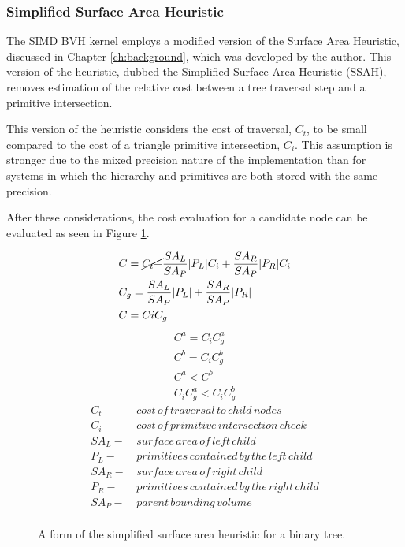 \subsubsection{Simplified Surface Area Heuristic}

The SIMD BVH kernel employs a modified version of the Surface Area Heuristic,
discussed in Chapter \ref{ch:background}, which was developed by the
author. This version of the heuristic, dubbed the Simplified Surface Area
Heuristic (SSAH), removes estimation of the relative cost between a tree
traversal step and a primitive intersection.

This version of the heuristic considers the cost of traversal, $C_{t}$, to be
small compared to the cost of a triangle primitive intersection, $C_{i}$. This
assumption is stronger due to the mixed precision nature of the implementation
than for systems in which the hierarchy and primitives are both stored with the
same precision.

After these considerations, the cost evaluation for a candidate node can be
evaluated as seen in Figure \ref{fig:SSAH}.

\begin{figure}[H]
  \begin{align}
&C =  \cancel{C_{t} +} \frac{SA_{L}}{SA_{P}} |P_{L}|C_{i} + \frac{SA_{R}}{SA_{P}} |P_{R}|C_{i} \\
&C_{g} = \frac{SA_{L}}{SA_{P}} |P_{L}| +  \frac{SA_{R}}{SA_{P}}|P_{R}| \\
&C = C{i}C_{g}
  \end{align}
  \begin{align*}
    C^{a} = C_{i} C^{a}_{g} \\
    C^{b} = C_{i} C^{b}_{g} \\
    C^{a} < C^{b} \\
    C_{i}C^{a}_{g} < C_{i}C^{b}_{g}
  \end{align*}
  \begin{align*}
    C_{t} - & \,cost\, of\, traversal\, to\, child\, nodes \\
    C_{i} - & \, cost\, of\, primitive\, intersection\, check\, \\
    SA_{L} - &  \,surface\, area\, of\, left\, child \\
    P_{L} - & \, primitives\, contained\, by\, the\, left\, child  \\
    SA_{R} - & \, surface\, area\, of\, right\, child \\
    P_{R} - & \, primitives\, contained\, by\, the\, right\, child \\
    SA_{P} - & \, parent\, bounding\, volume \\
  \end{align*}
  \caption{A form of the simplified surface area heuristic for a binary tree.}
  \label{fig:SSAH}
\end{figure}

